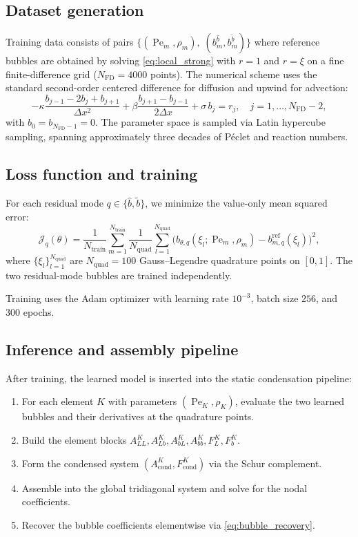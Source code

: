 \documentclass[11pt]{article}
\newcommand{\Pe}{\operatorname{Pe}}
\theoremstyle{remark}
\begin{document}
\subsection{Dataset generation}

Training data consists of pairs $\{(\Pe_m, \rho_m),\;(b_m^{\widehat{b}}, b_m^{\widetilde{b}})\}$ where reference bubbles are obtained by solving \eqref{eq:local_strong} with $r = 1$ and $r = \xi$ on a fine finite-difference grid ($N_{\mathrm{FD}} = 4000$ points). The numerical scheme uses the standard second-order centered difference for diffusion and upwind for advection:
\begin{equation}
-\kappa\frac{b_{j-1} - 2b_j + b_{j+1}}{\Delta x^2}
+ \beta\frac{b_{j+1} - b_{j-1}}{2\Delta x}
+ \sigma\,b_j = r_j, \quad j = 1,\ldots,N_{\mathrm{FD}}-2,
\end{equation}
with $b_0 = b_{N_{\mathrm{FD}}-1} = 0$. The parameter space is sampled via Latin hypercube sampling, spanning approximately three decades of P\'{e}clet and reaction numbers.

\subsection{Loss function and training}

For each residual mode $q \in \{\widehat{b}, \widetilde{b}\}$, we minimize the value-only mean squared error:
\begin{equation}\label{eq:loss}
\mathcal{J}_q(\theta) = \frac{1}{N_{\mathrm{train}}} \sum_{m=1}^{N_{\mathrm{train}}}
\frac{1}{N_{\mathrm{quad}}} \sum_{l=1}^{N_{\mathrm{quad}}}
\bigl(b_{\theta,q}(\xi_l; \Pe_m, \rho_m) - b_{m,q}^{\mathrm{ref}}(\xi_l)\bigr)^2,
\end{equation}
where $\{\xi_l\}_{l=1}^{N_{\mathrm{quad}}}$ are $N_{\mathrm{quad}} = 100$ Gauss--Legendre quadrature points on $[0,1]$. The two residual-mode bubbles are trained independently.

Training uses the Adam optimizer with learning rate $10^{-3}$, batch size $256$, and $300$ epochs.

\subsection{Inference and assembly pipeline}

After training, the learned model is inserted into the static condensation pipeline:
\begin{enumerate}[nosep]
    \item For each element $K$ with parameters $(\Pe_K, \rho_K)$, evaluate the two learned bubbles and their derivatives at the quadrature points.
    \item Build the element blocks $A_{LL}^K, A_{Lb}^K, A_{bL}^K, A_{bb}^K, F_L^K, F_b^K$.
    \item Form the condensed system $(A_{\mathrm{cond}}^K, F_{\mathrm{cond}}^K)$ via the Schur complement.
    \item Assemble into the global tridiagonal system and solve for the nodal coefficients.
    \item Recover the bubble coefficients elementwise via \eqref{eq:bubble_recovery}.
\end{enumerate}
\end{document}
